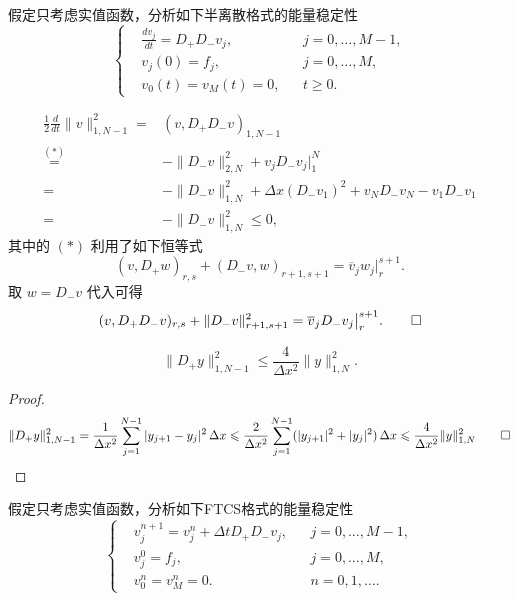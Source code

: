 \begin{example}
    假定只考虑实值函数，分析如下半离散格式的能量稳定性
    \[
        \left\{
        \begin{aligned}
             & \frac{d v_j}{d t} = D_+ D_- v_j, &  & j=0,\dots,M-1, \\
             & v_j(0) = f_j,                    &  & j=0,\dots,M,   \\
             & v_0(t) = v_M(t) = 0,             &  & t \ge 0.
        \end{aligned}
        \right.
    \]
\end{example}

\begin{solution*}
    \begin{align*}
        \frac12 \frac{d}{dt} \|v\|_{1,N-1}^2
        ={}                & \left( v,D_+ D_- v \right)_{1,N-1}                                      \\
        \overset{(*)}{=}{} & - \| D_- v\|_{2,N}^2 + v_j D_- v_j \big|_1^N                            \\
        ={}                & - \| D_- v\|_{1,N}^2 + \Delta x (D_- v_1)^2 + v_N D_- v_N - v_1 D_- v_1 \\
        ={}                & - \| D_- v\|_{1,N}^2 \le 0,
    \end{align*}
    其中的 $(*)$ 利用了如下恒等式
    \[
        (v,D_+ w)_{r,s} + (D_- v, w)_{r+1,s+1} = \overline{v}_j w_j \big|_r^{s+1}.
    \]
    取 $w = D_- v$ 代入可得
    \[
        (v, D_+ D_- v)_{r,s} + \|D_- v\|^2_{r+1,s+1} = \overline{v}_j D_- v_j \big|_r^{s+1}. \qedhere
    \]
\end{solution*}

\begin{lemma}\label{lemma:ib-1}
    \[
        \| D_+ y \|_{1,N-1}^2 \le \frac{4}{\Delta x^2} \| y \|_{1,N}^2.
    \]
\end{lemma}

\begin{proof}
    \[
        \| D_+ y \|_{1,N-1}^2
        =  \frac{1}{\Delta x^2} \sum_{j=1}^{N-1} |y_{j+1} - y_j|^2\, \Delta x
        \le \frac{2}{\Delta x^2} \sum_{j=1}^{N-1}(|y_{j+1}|^2 + |y_j|^2)\, \Delta x
        \le \frac{4}{\Delta x^2} \| y \|_{1,N}^2 \qedhere
    \]
\end{proof}

\begin{example}
    假定只考虑实值函数，分析如下FTCS格式的能量稳定性
    \[
        \left\{
        \begin{aligned}
             & v_j^{n+1} = v_j^n + \Delta t D_+D_- v_j, &  & j=0,\dots,M-1, \\
             & v_j^0 = f_j,                             &  & j=0,\dots,M,   \\
             & v_0^n = v_M^n = 0.                       &  & n=0,1,\dots.
        \end{aligned}
        \right.
    \]
\end{example}

